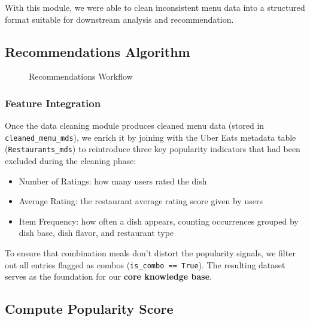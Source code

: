 \documentclass[
  11pt,
  a4paper,
  DIV=11,
  numbers=noendperiod]{scrartcl}
\providecommand{\tightlist}{%
  \setlength{\itemsep}{0pt}\setlength{\parskip}{0pt}}\usepackage{longtable,booktabs,array}
\begin{document}
With this module, we were able to clean inconsistent menu data into a
structured format suitable for downstream analysis and recommendation.

\subsection{Recommendations Algorithm}\label{recommendations-algorithm}

\begin{figure}

\caption{\label{fig-rec-flow}Recommendations Workflow}


\end{figure}%

\subsubsection{Feature Integration}\label{feature-integration}

Once the data cleaning module produces cleaned menu data (stored in
\texttt{cleaned\_menu\_mds}), we enrich it by joining with the Uber Eats
metadata table (\texttt{Restaurants\_mds}) to reintroduce three key
popularity indicators that had been excluded during the cleaning phase:

\begin{itemize}
\tightlist
\item
  Number of Ratings: how many users rated the dish
\item
  Average Rating: the restaurant average rating score given by users
\item
  Item Frequency: how often a dish appears, counting occurrences grouped
  by dish base, dish flavor, and restaurant type
\end{itemize}

To ensure that combination meals don't distort the popularity signals,
we filter out all entries flagged as combos
(\texttt{is\_combo\ ==\ True}). The resulting dataset serves as the
foundation for our \textbf{core knowledge base}.

\subsection{Compute Popularity Score}\label{compute-popularity-score}
\end{document}
